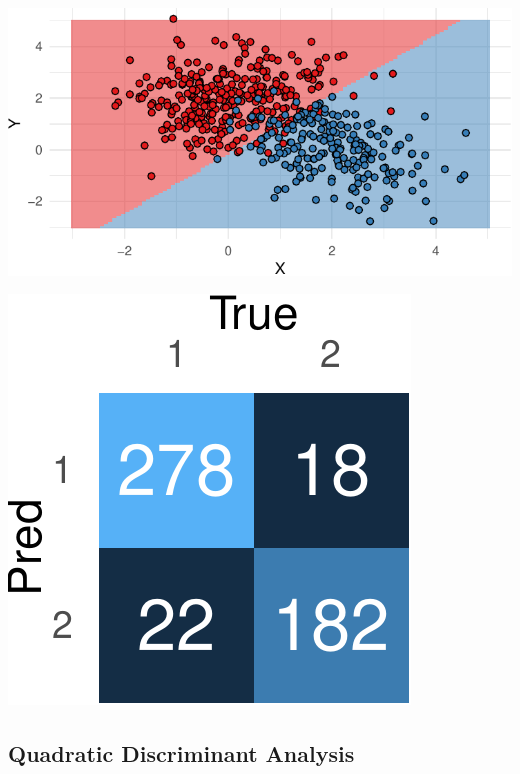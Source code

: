 \documentclass[12pt,ignorenonframetext,]{beamer}
\begin{document}
\begin{frame}{}
\protect\hypertarget{section}{}

\begin{center}\includegraphics{CSS_Presentation_files/figure-beamer/unnamed-chunk-3-1} \end{center}

\end{frame}

\begin{frame}{}
\protect\hypertarget{section-1}{}

\begin{center}\includegraphics{CSS_Presentation_files/figure-beamer/unnamed-chunk-4-1} \end{center}

\end{frame}

\hypertarget{quadratic-discriminant-analysis}{%
\subsection{Quadratic Discriminant
Analysis}\label{quadratic-discriminant-analysis}}
\end{document}
